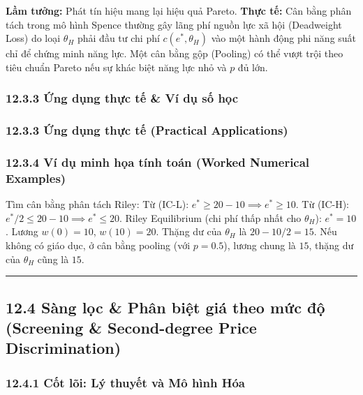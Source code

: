 \documentclass[
]{article}
\begin{document}
\textbf{Lầm tưởng:} Phát tín hiệu mang lại hiệu quả Pareto. \textbf{Thực
tế:} Cân bằng phân tách trong mô hình Spence thường gây lãng phí nguồn
lực xã hội (Deadweight Loss) do loại \(\theta_H\) phải đầu tư chi phí
\(c(e^*, \theta_H)\) vào một hành động phi năng suất chỉ để chứng minh
năng lực. Một cân bằng gộp (Pooling) có thể vượt trội theo tiêu chuẩn
Pareto nếu sự khác biệt năng lực nhỏ và \(p\) đủ lớn.

\subsubsection{12.3.3 Ứng dụng thực tế \& Ví dụ số
học}\label{ux1ee9ng-dux1ee5ng-thux1ef1c-tux1ebf-vuxed-dux1ee5-sux1ed1-hux1ecdc-2}

\subsubsection{12.3.3 Ứng dụng thực tế (Practical
Applications)}\label{ux1ee9ng-dux1ee5ng-thux1ef1c-tux1ebf-practical-applications-42}

\subsubsection{12.3.4 Ví dụ minh họa tính toán (Worked Numerical
Examples)}\label{vuxed-dux1ee5-minh-hux1ecda-tuxednh-touxe1n-worked-numerical-examples-34}

Tìm cân bằng phân tách Riley: Từ (IC-L):
\(e^* \ge 20 - 10 \implies e^* \ge 10\). Từ (IC-H):
\(e^*/2 \le 20 - 10 \implies e^* \le 20\). Riley Equilibrium (chi phí
thấp nhất cho \(\theta_H\)): \(e^* = 10\). Lương \(w(0) = 10\),
\(w(10) = 20\). Thặng dư của \(\theta_H\) là \(20 - 10/2 = 15\). Nếu
không có giáo dục, ở cân bằng pooling (với \(p=0.5\)), lương chung là
\(15\), thặng dư của \(\theta_H\) cũng là \(15\).

\begin{center}\rule{0.5\linewidth}{0.5pt}\end{center}

\subsection{12.4 Sàng lọc \& Phân biệt giá theo mức độ (Screening \&
Second-degree Price
Discrimination)}\label{suxe0ng-lux1ecdc-phuxe2n-biux1ec7t-giuxe1-theo-mux1ee9c-ux111ux1ed9-screening-second-degree-price-discrimination}

\subsubsection{12.4.1 Cốt lõi: Lý thuyết và Mô hình
Hóa}\label{cux1ed1t-luxf5i-luxfd-thuyux1ebft-vuxe0-muxf4-huxecnh-huxf3a-3}
\end{document}
